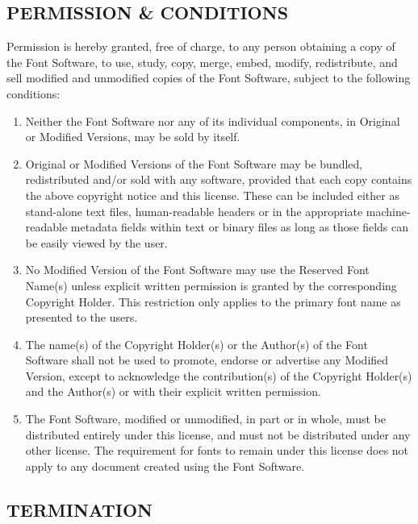 \documentclass[12pt,a4paper,openany]{article}
\newcommand{\pageheader}[1]{%
	\clearpage
	\pagestyle{fancy}
	\lhead{\LARGE\bfseries#1}
	\cfoot{}
}
\begin{document}
\subsection*{PERMISSION \& CONDITIONS}

Permission is hereby granted, free of charge, to any person obtaining
a copy of the Font Software, to use, study, copy, merge, embed, modify,
redistribute, and sell modified and unmodified copies of the Font
Software, subject to the following conditions:

\pageheader{SIL Open Font License}

\begin{enumerate}

\item Neither the Font Software nor any of its individual components,
in Original or Modified Versions, may be sold by itself.

\item Original or Modified Versions of the Font Software may be bundled,
redistributed and/or sold with any software, provided that each copy
contains the above copyright notice and this license. These can be
included either as stand-alone text files, human-readable headers or
in the appropriate machine-readable metadata fields within text or
binary files as long as those fields can be easily viewed by the user.

\item No Modified Version of the Font Software may use the Reserved Font
Name(s) unless explicit written permission is granted by the corresponding
Copyright Holder. This restriction only applies to the primary font name as
presented to the users.

\item The name(s) of the Copyright Holder(s) or the Author(s) of the Font
Software shall not be used to promote, endorse or advertise any
Modified Version, except to acknowledge the contribution(s) of the
Copyright Holder(s) and the Author(s) or with their explicit written
permission.

\item The Font Software, modified or unmodified, in part or in whole,
must be distributed entirely under this license, and must not be
distributed under any other license. The requirement for fonts to
remain under this license does not apply to any document created
using the Font Software.

\end{enumerate}

\subsection*{TERMINATION}
\end{document}
